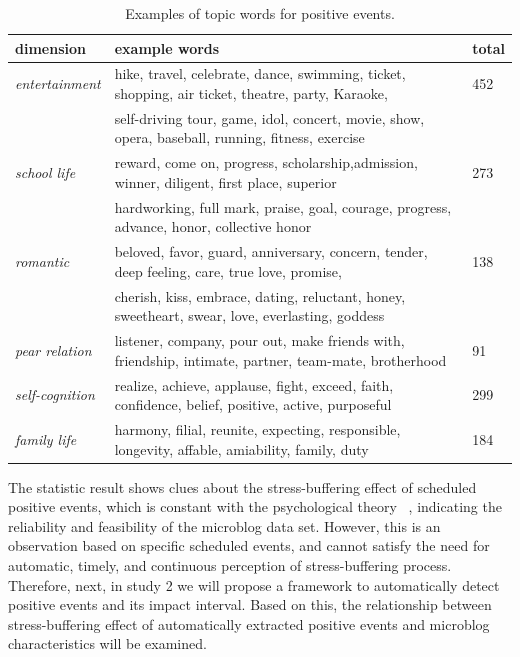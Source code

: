 \begin{table}
\centering
\caption{\small{Examples of topic words for positive events.}}
\label{tab:keyWords}
\small{
\begin{tabular}{lll}
\toprule
dimension & example words & total \\ \midrule
\emph{entertainment}  & hike, travel, celebrate, dance, swimming, ticket, shopping, air ticket, theatre, party, Karaoke,& 452\\
                      & self-driving tour, game, idol, concert, movie, show, opera, baseball, running, fitness, exercise & \\
\emph{school life}    & reward, come on, progress, scholarship,admission, winner, diligent, first place, superior & 273\\
				      & hardworking, full mark,  praise, goal, courage, progress, advance, honor, collective honor& \\
\emph{romantic}       &  beloved, favor, guard, anniversary,  concern, tender, deep feeling, care, true love, promise, & 138\\
				      & cherish, kiss, embrace, dating, reluctant, honey, sweetheart, swear, love, everlasting, goddess &\\
\emph{pear relation}  & listener, company, pour out, make friends with, friendship, intimate, partner, team-mate, brotherhood& 91\\
\emph{self-cognition} & realize, achieve, applause, fight, exceed, faith, confidence, belief, positive, active, purposeful & 299\\
\emph{family life}    & harmony, filial, reunite, expecting, responsible, longevity, affable, amiability, family, duty & 184\\
\bottomrule
\end{tabular}}
\end{table}


The statistic result shows clues about the stress-buffering effect of scheduled positive events,
which is constant with the psychological theory ~\citep{Cohen1984Positive, Cohen2010Positive, Needles1990Positive},
indicating the reliability and feasibility of the microblog data set.
However,
this is an observation based on specific scheduled events,
and cannot satisfy the need for automatic, timely, and continuous perception of stress-buffering process.
Therefore, next, in study 2 we will propose a framework to automatically detect positive events and its impact interval.
Based on this,
the relationship between stress-buffering effect of automatically extracted positive events and
microblog characteristics will be examined.
